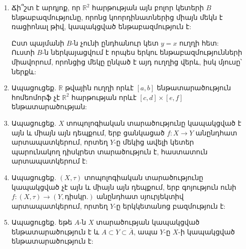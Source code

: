 \begin{enumerate}[label=\thesection.\arabic*.]
\item Ճի՞շտ է արդյոք, որ $\mathbb{R}^2$ հարթության այն բոլոր կետերի $B$ ենթաբազմությունը, որոնց կոորդինատներից միայն մեկն է ռացիոնալ թիվ, կապակցված ենթաբազմություն է:
\begin{hint}
Ըստ պայմանի $B$-ն չունի ընդհանուր կետ $y=x$ ուղղի հետ: Ուստի $B$-ն ներկայացվում է որպես երկու ենթաբազմությունների միավորում, որոնցից մեկը ընկած է այդ ուղղից վերև, իսկ մյուսը՝ ներքև:
\end{hint}

\item Ապացուցեք. $\mathbb{R}$ թվային ուղղի որևէ $[a,b]$ ենթատարածություն հոմեոմորֆ չէ $\mathbb{R}^2$ հարթության որևէ $[c,d] \times [e,f]$ ենթատարածության:

\item Ապացուցեք. $X$ տոպոլոգիական տարածությունը կապակցված է այն և միայն այն դեպքում, երբ ցանկացած $f: X \to Y$ անընդհատ արտապատկերում, որտեղ $Y$-ը մեկից ավելի կետեր պարունակող դիսկրետ տարածություն է, հաստատուն արտապատկերում է:

\item Ապացուցեք. $(X, \tau)$ տոպոլոգիական տարածությունը կապակցված չէ այն և միայն այն դեպքում, երբ գոյություն ունի $f: (X, \tau) \to (Y, \text{դիսկր.})$ անընդհատ սյուրյեկտիվ արտապատկերում, որտեղ $Y$-ը երկկետանոց բազմություն է:

\item Ապացուցեք. եթե $A$-ն $X$ տարածության կապակցված ենթատարածություն է և $A \subset Y \subset \bar{A}$, ապա $Y$-ը $X$-ի կապակցված ենթատարածություն է:

\end{enumerate}
